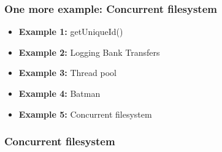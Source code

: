 \documentclass[aspectratio=169]{beamer}
\begin{document}
\begin{frame}\frametitle{One more example: Concurrent filesystem}
    \begin{itemize}
      \item \textbf{Example 1:} getUniqueId()
      \item \textbf{Example 2:} Logging Bank Transfers
      \item \textbf{Example 3:} Thread pool
      \item \textbf{Example 4:} Batman
      \item \alert{\textbf{Example 5:} Concurrent filesystem}
    \end{itemize}
\end{frame}


\begin{frame}\frametitle{Concurrent filesystem}
\end{frame}
\end{document}
